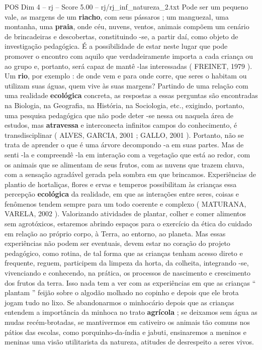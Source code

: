 \begin{textsample}{POS Dim 4 – rj – Score 5.00 – rj/rj\_inf\_natureza\_2.txt}
Pode ser um pequeno vale, as margens de um \textbf{riacho}, com seus pássaros ; um manguezal, uma montanha, uma \textbf{praia}, onde céu, nuvens, ventos, animais compõem um cenário de brincadeiras e descobertas, constituindo -se, a partir daí, como objeto de investigação pedagógica.
É a possibilidade de estar neste lugar que pode promover o encontro com aquilo que verdadeiramente importa a cada criança ou ao grupo e, portanto, será capaz de mantê -las interessadas ( FREINET, 1979 ).
Um \textbf{rio}, por exemplo : de onde vem e para onde corre, que seres o habitam ou utilizam suas águas, quem vive às suas margens?
Partindo de uma relação com uma realidade \textbf{ecológica} concreta, as respostas a essas perguntas são encontradas na Biologia, na Geografia, na História, na Sociologia, etc., exigindo, portanto, uma pesquisa pedagógica que não pode deter -se nessa ou naquela área de estudos, mas \textbf{atravessa} e interconecta infinitos campos do conhecimento, é transdisciplinar ( ALVES, GARCIA, 2001 ; GALLO, 2001 ).
Portanto, não se trata de aprender o que é uma árvore decompondo -a em suas partes.
Mas de senti -la e compreendê -la em interação com a vegetação que está ao redor, com os animais que se alimentam de seus frutos, com as nuvens que trazem chuva, com a sensação agradável gerada pela sombra em que brincamos.
Experiências de plantio de hortaliças, flores e ervas e temperos possibilitam às crianças essa percepção \textbf{ecológica} da realidade, em que as interações entre seres, coisas e fenômenos tendem sempre para um todo coerente e complexo ( MATURANA, VARELA, 2002 ).
Valorizando atividades de plantar, colher e comer alimentos sem agrotóxicos, estaremos abrindo espaços para o exercício da ética do cuidado em relação ao próprio corpo, à Terra, ao entorno, ao planeta.
Mas essas experiências não podem ser eventuais, devem estar no coração do projeto pedagógico, como rotina, de tal forma que as crianças tenham acesso direto e frequente, reguem, participem da limpeza da horta, da colheita, integrando -se, vivenciando e conhecendo, na prática, os processos de nascimento e crescimento dos frutos da terra.
Isso nada tem a ver com as experiências em que as crianças “ plantam ” feijão sobre o algodão molhado no copinho e depois que ele brota jogam tudo no lixo.
Se abandonarmos o minhocário depois que as crianças entendem a importância da minhoca no trato \textbf{agrícola} ; se deixamos sem água as mudas recém-brotadas, se mantivermos em cativeiro os animais tão comuns nos pátios das escolas, como porquinho-da-índia e jabuti, ensinaremos a meninos e meninas uma visão utilitarista da natureza, atitudes de desrespeito a seres vivos.

\end{textsample}
